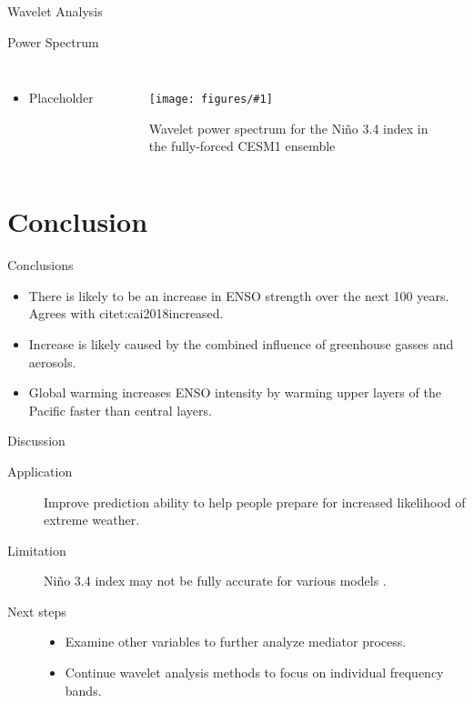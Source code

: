 \documentclass{beamer}
\newcommand{\myfig}[3]{
  \begin{figure}
    \centering
    \texttt{[image: figures/\#1]}
    \caption{#2}
    \label{fig:#3}
  \end{figure}
}
\begin{document}
\begin{frame}{Wavelet Analysis}

\end{frame}

\begin{frame}{Power Spectrum}

  \begin{columns}
    \begin{itemize}
    \item Placeholder
    \end{itemize}
  \myfig{spectrum1.pdf}{Wavelet power spectrum for the Niño 3.4 index in the fully-forced CESM1 ensemble}{spectrum1}
  \end{columns}

\end{frame}

\section{Conclusion}

\begin{frame}{Conclusions}

  \begin{itemize}
  \item There is likely to be an increase in ENSO strength over the next 100 years. Agrees with citet:cai2018increased.
  \item Increase is likely caused by the combined influence of greenhouse gasses and aerosols.
  \item Global warming increases ENSO intensity by warming upper layers of the Pacific faster than central layers.
  \end{itemize}

\end{frame}

\begin{frame}{Discussion}

  \begin{description}
  \item[Application] Improve prediction ability to help people prepare for increased likelihood of extreme weather.
  \item[Limitation] Niño 3.4 index may not be fully accurate for various models \citep{cai2018increased}.
  \item[Next steps]
    \begin{itemize}
    \item Examine other variables to further analyze mediator process.
    \item Continue wavelet analysis methods to focus on individual frequency bands.
    \end{itemize}
  \end{description}

\end{frame}
\end{document}
